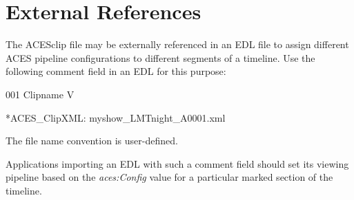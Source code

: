 \regularsectionformat	%
\chapter{External References}

The ACESclip file may be externally referenced in an EDL file to assign different ACES pipeline configurations to different segments of a timeline.    Use the following comment field in an EDL for this purpose:

001 Clipname  V             %

*ACES\_ClipXML:   myshow\_LMTnight\_A0001.xml

The file name convention is user-defined.

Applications importing an EDL with such a comment field should set its viewing pipeline based on the \textit{aces:Config} value for a particular marked section of the timeline.
